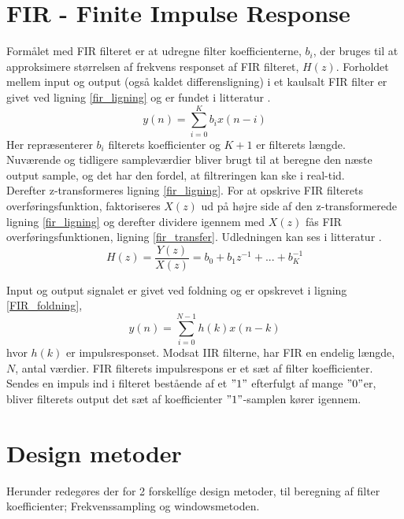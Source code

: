 \section{FIR - Finite Impulse Response}\label{sec:fir}
Formålet med FIR filteret er at udregne filter koefficienterne, $b_{i}$, der bruges til at approksimere størrelsen af frekvens responset af FIR filteret, $H(z)$.
Forholdet mellem input og output (også kaldet differensligning) i et kaulsalt FIR filter er givet ved ligning \ref{fir_ligning} og er fundet i litteratur \cite[Side. 217]{Tan2013}.
\begin {equation} 
y(n)=\sum\limits_{i=0}^{K}b_{i}x(n-i) \label{fir_ligning}
\end {equation}
Her repræsenterer $b_{i}$ filterets koefficienter og $K+1$ er filterets længde. Nuværende og tidligere sampleværdier bliver brugt til at beregne den næste output sample, og det har den fordel, at filtreringen kan ske i real-tid.
\\
Derefter z-transformeres ligning \ref{fir_ligning}. For at opskrive FIR filterets overføringsfunktion, faktoriseres $X(z)$ ud på højre side af den z-transformerede ligning \ref{fir_ligning} og derefter dividere igennem med $X(z)$ fås FIR overføringsfunktionen, ligning \ref{fir_transfer}. Udledningen kan ses i litteratur \cite[Side. 218]{Tan2013}.
\begin {equation}
H(z)=\frac{Y(z)}{X(z)}=b_{0}+b_{1}z^{-1}+...+b_{K}^{-1} \label{fir_transfer}
\end {equation}

Input og output signalet er givet ved foldning og er opskrevet i ligning \ref{FIR_foldning},
\begin {equation} 
y(n) = \sum\limits_{i=0}^{N-1} h(k)x(n-k) \label{FIR_foldning}
\end {equation}
hvor $h(k)$ er impulsresponset. Modsat IIR filterne, har FIR en endelig længde, $N$, antal værdier. FIR filterets impulsrespons er et sæt af filter koefficienter. Sendes en impuls ind i filteret bestående af et $"1"$ efterfulgt af mange $"0"$er, bliver filterets output det sæt af koefficienter $"1"$-samplen kører igennem. 


%

\section{Design metoder} \label{sec:fir_design}
Herunder redegøres der for 2 forskellíge design metoder, til beregning af filter koefficienter; Frekvenssampling og windowsmetoden.
